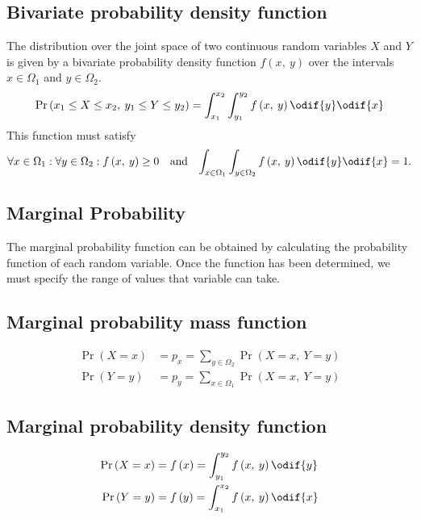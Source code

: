 \documentclass{article}
\begin{document}
\begin{multicols}{3}
    \subsection{Bivariate probability density function}
    The distribution over the joint space of two continuous random variables \(X\) and \(Y\) is  given by a
    bivariate probability density function \(f\left( x,\: y \right)\)
    over the intervals \(x \in \Omega_1\) and \(y \in \Omega_2\).
    \begin{equation*}
        \Pr{\left( x_1 \leq X \leq x_2,\: y_1 \leq Y \leq y_2 \right)} = \int_{x_1}^{x_2} \int_{y_1}^{y_2} f\left( x,\: y \right) \odif{y} \odif{x}
    \end{equation*}
    This function must satisfy
    \begin{align*}
        \forall x \in \Omega_1 : \forall y \in \Omega_2 : f\left( x,\: y \right) \geq 0 &  & \text{and} &  &
        \int_{x \in \Omega_1} \int_{y \in \Omega_2} f\left( x,\: y \right) \odif{y} \odif{x} = 1.
    \end{align*}
    \subsection{Marginal Probability}
    The marginal probability function can be obtained by calculating the probability function of each random variable.
    Once the function has been determined, we must specify the range of values that variable can take.
    \subsection{Marginal probability mass function}
    \begin{align*}
        \Pr{\left( X = x \right)} & = p_x = \sum_{y \in \Omega_2} \Pr{\left( X = x,\: Y = y \right)} \\
        \Pr{\left( Y = y \right)} & = p_y = \sum_{x \in \Omega_1} \Pr{\left( X = x,\: Y = y \right)}
    \end{align*}
    \subsection{Marginal probability density function}
    \begin{align*}
        \Pr{\left( X = x \right)} & = f\left( x \right) = \int_{y_1}^{y_2} f\left( x,\: y \right) \odif{y} \\
        \Pr{\left( Y = y \right)} & = f\left( y \right) = \int_{x_1}^{x_2} f\left( x,\: y \right) \odif{x}
    \end{align*}

\end{multicols}
\end{document}
